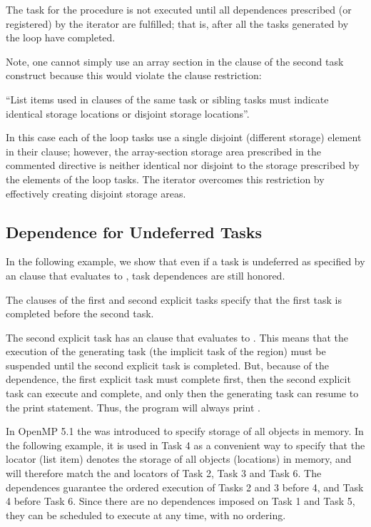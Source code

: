 The task for the  procedure is not executed until all dependences
prescribed (or registered) by the iterator are fulfilled; that is,
after all the tasks generated by the loop have completed.

Note, one cannot simply use an array section in the  clause
of the second task construct because this would violate the  clause restriction:

``List items used in  clauses of the same task or sibling tasks
must indicate identical storage locations or disjoint storage locations''.

In this case each of the loop tasks use a single disjoint (different storage)
element in their  clause; however,
the array-section storage area prescribed in the commented directive is neither
identical nor disjoint to the storage prescribed by the elements of the
loop tasks.  The iterator overcomes this restriction by effectively
creating  disjoint storage areas.



\subsection{Dependence for Undeferred Tasks}
\label{subsec:depend_undefer_task}

In the following example, we show that even if a task is undeferred as specified
by an  clause that evaluates to , task dependences are
still honored.

The  clauses of the first and second explicit tasks specify that
the first task is completed before the second task.

The second explicit task has an  clause that evaluates to .
This means that the execution of the generating task (the implicit task of
the  region) must be suspended until the second explicit task
is completed.
But, because of the dependence, the first explicit task must complete first,
then the second explicit task can execute and complete, and only then 
the generating task can resume to the print statement.
Thus, the program will always print .

\clearpage



In OpenMP 5.1 the   was introduced
to specify storage of all objects in memory. In the following example,
it is used in Task 4 as a convenient way to specify that the locator
(list item) denotes the storage of all objects (locations) in memory, and 
will therefore match the  and  locators of Task 2, Task 3 and Task 6.
The dependences guarantee the ordered execution of Tasks 2 and 3 before 4, and
Task 4 before Task 6.
Since there are no dependences imposed on Task 1 and Task 5, they can be
scheduled to execute at any time, with no ordering.

